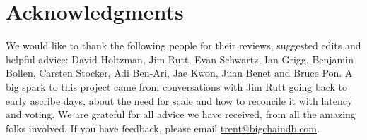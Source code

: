 \section{Acknowledgments}\label{sec:acknowledgments}

We would like to thank the following people for their reviews, suggested edits and helpful advice: 
David Holtzman, 
Jim Rutt, 
Evan Schwartz, 
Ian Grigg, 
Benjamin Bollen, 
Carsten Stocker, 
Adi Ben-Ari, 
Jae Kwon, 
Juan Benet 
and Bruce Pon. 
A big spark to this project came from conversations with Jim Rutt going back to early ascribe days, about the need for scale and how to reconcile it with latency and voting. We are grateful for all advice we have received, from all the amazing folks involved.
If you have feedback, please email \href{mailto:trent@bigchaindb.com}{trent@bigchaindb.com}.